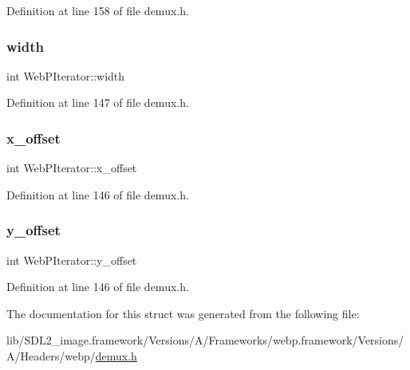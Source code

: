 Definition at line 158 of file demux.\+h.

\mbox{\label{struct_web_p_iterator_a0762ef1f2998664111ed0cf814008dd4}} 
\subsubsection{\texorpdfstring{width}{width}}
{\footnotesize\ttfamily int Web\+P\+Iterator\+::width}



Definition at line 147 of file demux.\+h.

\mbox{\label{struct_web_p_iterator_a5cdafa3ad6bedc0f8eb47388f4361c75}} 
\subsubsection{\texorpdfstring{x\_offset}{x\_offset}}
{\footnotesize\ttfamily int Web\+P\+Iterator\+::x\+\_\+offset}



Definition at line 146 of file demux.\+h.

\mbox{\label{struct_web_p_iterator_a35d39245b3c9b8ddb2eb058bec827dbb}} 
\subsubsection{\texorpdfstring{y\_offset}{y\_offset}}
{\footnotesize\ttfamily int Web\+P\+Iterator\+::y\+\_\+offset}



Definition at line 146 of file demux.\+h.



The documentation for this struct was generated from the following file\+:\begin{DoxyCompactItemize}
\item 
lib/\+S\+D\+L2\+\_\+image.\+framework/\+Versions/\+A/\+Frameworks/webp.\+framework/\+Versions/\+A/\+Headers/webp/\mbox{\hyperlink{demux_8h}{demux.\+h}}\end{DoxyCompactItemize}
